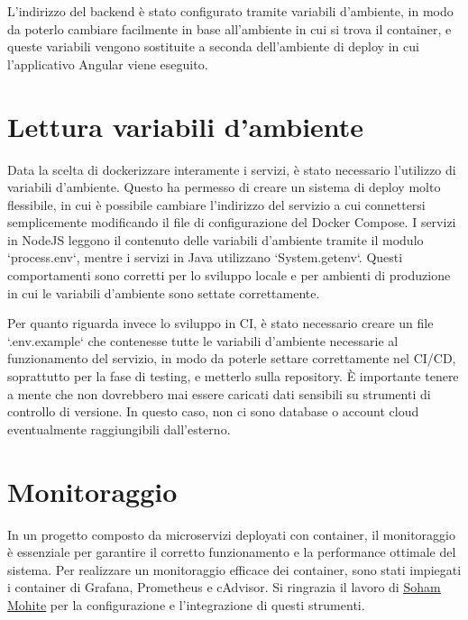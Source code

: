 L'indirizzo del backend è stato configurato tramite variabili d'ambiente, in modo da poterlo cambiare facilmente in base all'ambiente in cui si trova il container, e queste variabili vengono sostituite a seconda dell'ambiente di deploy in cui l'applicativo Angular viene eseguito.


\section{Lettura variabili d'ambiente}

Data la scelta di dockerizzare interamente i servizi, è stato necessario l'utilizzo di variabili d'ambiente. Questo ha permesso di creare un sistema di deploy molto flessibile, in cui è possibile cambiare l'indirizzo del servizio a cui connettersi semplicemente modificando il file di configurazione del Docker Compose. I servizi in NodeJS leggono il contenuto delle variabili d'ambiente tramite il modulo `process.env`, mentre i servizi in Java utilizzano `System.getenv`. Questi comportamenti sono corretti per lo sviluppo locale e per ambienti di produzione in cui le variabili d'ambiente sono settate correttamente.

Per quanto riguarda invece lo sviluppo in CI, è stato necessario creare un file `.env.example` che contenesse tutte le variabili d'ambiente necessarie al funzionamento del servizio, in modo da poterle settare correttamente nel CI/CD, soprattutto per la fase di testing, e metterlo sulla repository. È importante tenere a mente che non dovrebbero mai essere caricati dati sensibili su strumenti di controllo di versione. In questo caso, non ci sono database o account cloud eventualmente raggiungibili dall'esterno.

\section{Monitoraggio}

In un progetto composto da microservizi deployati con container, il monitoraggio è essenziale per garantire il corretto funzionamento e la performance ottimale del sistema. Per realizzare un monitoraggio efficace dei container, sono stati impiegati i container di Grafana, Prometheus e cAdvisor.
Si ringrazia il lavoro di \href{https://medium.com/@sohammohite/docker-container-monitoring-with-cadvisor-prometheus-and-grafana-using-docker-compose-b47ec78efbc}{\underline{Soham Mohite}} per la configurazione e l'integrazione di questi strumenti.

